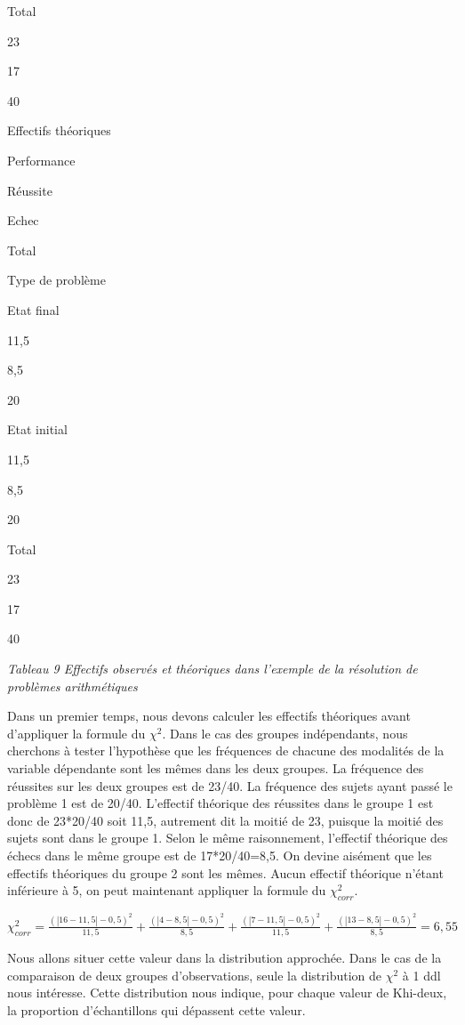 \documentclass[]{book}
\theoremstyle{definition}
\theoremstyle{definition}
\theoremstyle{definition}
\theoremstyle{remark}
\begin{document}
Total

23

17

40

Effectifs théoriques

Performance

Réussite

Echec

Total

Type de problème

Etat final

11,5

8,5

20

Etat initial

11,5

8,5

20

Total

23

17

40

\emph{Tableau 9 Effectifs observés et théoriques dans l'exemple de la
résolution de problèmes arithmétiques}

Dans un premier temps, nous devons calculer les effectifs théoriques
avant d'appliquer la formule du \(\chi ^{2}\). Dans le cas des groupes
indépendants, nous cherchons à tester l'hypothèse que les fréquences de
chacune des modalités de la variable dépendante sont les mêmes dans les
deux groupes. La fréquence des réussites sur les deux groupes est de
23/40. La fréquence des sujets ayant passé le problème 1 est de 20/40.
L'effectif théorique des réussites dans le groupe 1 est donc de 23*20/40
soit 11,5, autrement dit la moitié de 23, puisque la moitié des sujets
sont dans le groupe 1. Selon le même raisonnement, l'effectif théorique
des échecs dans le même groupe est de 17*20/40=8,5. On devine aisément
que les effectifs théoriques du groupe 2 sont les mêmes. Aucun effectif
théorique n'étant inférieure à 5, on peut maintenant appliquer la
formule du \(\chi ^2_{corr}\).

\(\chi _{corr} ^{2}=\frac{(\left | 16-11,5 \right |-0,5)^{2}}{11,5}+\frac{(\left | 4-8,5 \right |-0,5)^{2}}{8,5}+\frac{(\left | 7-11,5 \right |-0,5)^{2}}{11,5}+\frac{(\left | 13-8,5 \right |-0,5)^{2}}{8,5}=6,55\)

Nous allons situer cette valeur dans la distribution approchée. Dans le
cas de la comparaison de deux groupes d'observations, seule la
distribution de \(\chi ^2\) à 1 ddl nous intéresse. Cette distribution
nous indique, pour chaque valeur de Khi-deux, la proportion
d'échantillons qui dépassent cette valeur.
\end{document}
